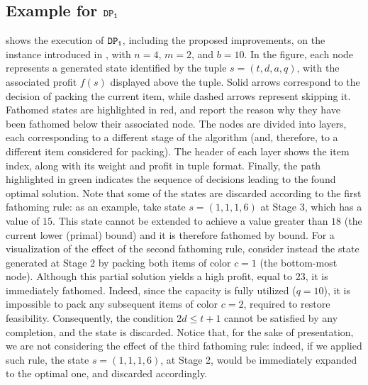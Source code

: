 \documentclass[preprint,11pt]{elsarticle}
\newcommand{\firstDP}{{\tt DP_1}}
\theoremstyle{definition}
\begin{document}
\subsection{Example for $\firstDP$}
 shows the execution of $\firstDP$, including the proposed improvements, on the instance introduced in , with $n=4$, $m =2$, and $b=10$.
In the figure, each node represents a generated state identified by the tuple $s = (t, d, a, q)$, with the associated profit $f(s)$ displayed above the tuple.
Solid arrows correspond to the decision of packing the current item, while dashed arrows represent skipping it. Fathomed states are highlighted in red, and report the reason why they have been fathomed below their associated node. The nodes are divided into layers, each corresponding to a different stage of the algorithm (and, therefore, to a different item considered for packing). 
The header of each layer shows the item index, along with its weight and profit in tuple format. Finally, the path highlighted in green indicates the sequence of decisions leading to the found optimal solution.
Note that some of the states are discarded according to the first fathoming rule: as an example, take state $s=(1,1,1,6)$ at Stage 3, which has a value of $15$.
This state cannot be extended to achieve a value greater than $18$ (the current lower (primal) bound) and it is therefore fathomed by bound.
For a visualization of the effect of the second fathoming rule, consider instead the state generated at Stage 2 by packing both items of color $c=1$ (the bottom-most node). 
Although this partial solution yields a high profit, equal to $23$, it is immediately fathomed. Indeed, since the capacity is fully utilized ($q=10$), it is impossible to pack any subsequent items of color $c=2$, required to restore feasibility. Consequently, the condition $2d \le t+1$ cannot be satisfied by any completion, and the state is discarded.
Notice that, for the sake of presentation, we are not considering the effect of the third fathoming rule: indeed, if we applied such rule, the state $s = (1,1,1,6)$, at Stage 2, would be immediately expanded to the optimal one, and discarded accordingly.
\end{document}
